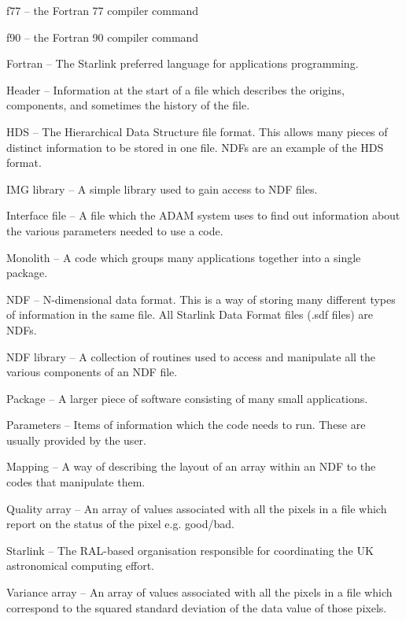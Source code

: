 \documentclass[11pt,nolof]{starlink}
\begin{document}
\textsf{f77} -- the Fortran 77 compiler command

\textsf{f90} -- the Fortran 90 compiler command

\textsf{Fortran} -- The Starlink preferred language for applications programming.

\textsf{Header} --
Information at the start of a file which describes the origins, components,
and sometimes the history of the file.

\textsf{HDS} --
The Hierarchical Data Structure file format. This allows many pieces of
distinct information to be stored in one file. NDFs are an example of
the HDS format.

\textsf{IMG library} --
A simple library used to gain access to NDF files.

\textsf{Interface file} -- A file which the ADAM system uses to find out
information about the various parameters needed to use a code.

\textsf{Monolith} --
A code which groups many applications together into a single package.

\textsf{NDF} -- N-dimensional data format. This is a way of storing many
different types of information in the same file. All Starlink Data Format
files (.sdf files) are NDFs.

\textsf{NDF library} --
A collection of routines used to access and manipulate all the various
components of an NDF file.

\textsf{Package} -- A larger piece of software consisting of many small
applications.

\textsf{Parameters} -- Items of information which the code needs to run. These
are usually provided by the user.

\textsf{Mapping} -- A way of describing the layout of an array within an NDF
to the codes that manipulate them.

\textsf{Quality array} -- An array of values associated with all the pixels in
a file which report on the status of the pixel e.g. good/bad.

\textsf{Starlink} -- The RAL-based organisation responsible for
coordinating the UK astronomical computing effort.

\textsf{Variance array} -- An array of values associated with all the pixels in
a file which correspond to the squared standard deviation of the data
value of those pixels.
\end{document}
